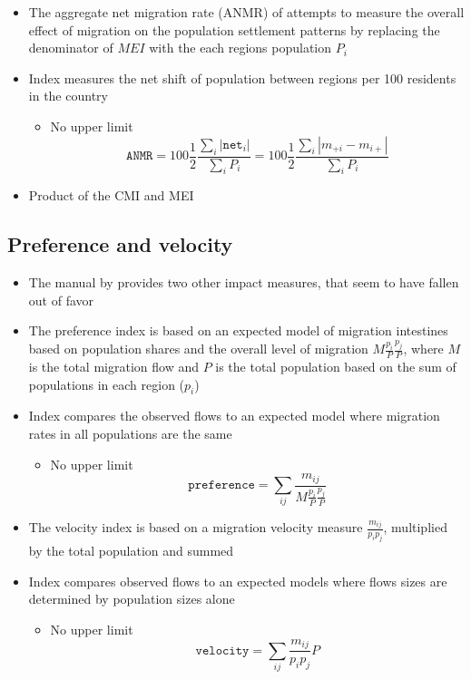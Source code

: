 \documentclass[
]{book}
\providecommand{\tightlist}{%
  \setlength{\itemsep}{0pt}\setlength{\parskip}{0pt}}
\begin{document}
\begin{itemize}
\tightlist
\item
  The aggregate net migration rate (ANMR) of \citet{Bell2002} attempts to measure the overall effect of migration on the population settlement patterns by replacing the denominator of \(MEI\) with the each regions population \(P_i\)
\item
  Index measures the net shift of population between regions per 100 residents in the country

  \begin{itemize}
  \tightlist
  \item
    No upper limit
    \[
    \texttt{ANMR} = 100 \frac{1}{2} \frac{\sum_{i} |\texttt{net}_i|}{\sum_{i} P_i} = 100 \frac{1}{2} \frac{\sum_{i} | m_{+i} - m_{i+} |}{\sum_{i} P_i}
    \]
  \end{itemize}
\item
  Product of the CMI and MEI
\end{itemize}

\hypertarget{preference-and-velocity}{%
\subsection{Preference and velocity}\label{preference-and-velocity}}

\begin{itemize}
\tightlist
\item
  The manual by \citet{UnitedNations1983} provides two other impact measures, that seem to have fallen out of favor
\item
  The preference index is based on an expected model of migration intestines based on population shares and the overall level of migration \(M \frac{p_{i}}{P}\frac{p_{j}}{P}\), where \(M\) is the total migration flow and \(P\) is the total population based on the sum of populations in each region (\(p_{i}\))
\item
  Index compares the observed flows to an expected model where migration rates in all populations are the same

  \begin{itemize}
  \tightlist
  \item
    No upper limit
    \[
    \texttt{preference} = \sum_{ij}{\frac{m_{ij}}{M \frac{p_{i}}{P}\frac{p_{j}}{P}}}
    \]
  \end{itemize}
\item
  The velocity index is based on a migration velocity measure \(\frac{m_{ij}}{p_{i} p_{j}}\), multiplied by the total population and summed
\item
  Index compares observed flows to an expected models where flows sizes are determined by population sizes alone

  \begin{itemize}
  \tightlist
  \item
    No upper limit
    \[
    \texttt{velocity}  = \sum_{ij}{\frac{m_{ij}}{p_{i} p_{j}}{P}}
    \]
  \end{itemize}
\end{itemize}
\end{document}
